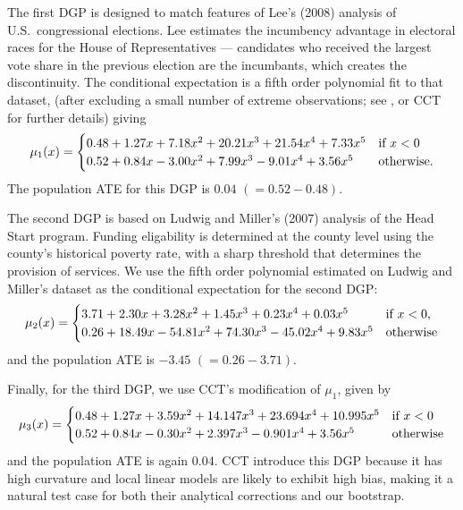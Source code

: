\documentclass[12pt,fleqn]{article}
\begin{document}
\nocite{lee2008rand}%
The first DGP is designed to match features of Lee's (2008) analysis of U.S.\
congressional elections. Lee estimates the incumbency advantage in electoral
races for the House of Representatives --- candidates who received the largest
vote share in the previous election are the incumbants, which creates the
discontinuity. The conditional expectation is a fifth order polynomial fit to
that dataset, (after excluding a small number of extreme observations; see
\citealp{IK}, or CCT for further details) giving
\begin{equation*}
  \mu_{1}(x) =
  \begin{cases}
    0.48 + 1.27x + 7.18x^{2} + 20.21x^{3} + 21.54x^{4} + 7.33x^{5}
    & \text{if}\ x < 0 \\
    0.52 + 0.84x - 3.00x^{2} + 7.99x^3 - 9.01x^4 + 3.56x^{5}
    & \text{otherwise}.
  \end{cases}
\end{equation*}
The population ATE for this DGP is $0.04$ $(= 0.52 - 0.48)$.

\nocite{ludwig2007}%
The second DGP is based on Ludwig and Miller's (2007) analysis of the Head Start
program. Funding eligability is determined at the county level using the
county's historical poverty rate, with a sharp threshold that determines the
provision of services. We use the fifth order polynomial estimated on Ludwig and
Miller's dataset as the conditional expectation for the second DGP:
\begin{equation*}
  \mu_{2}(x) =
  \begin{cases}
    3.71 + 2.30x + 3.28x^2 + 1.45x^3 + 0.23x^4 + 0.03x^5
    & \text{if}\ x < 0, \\
    0.26 + 18.49x - 54.81x^2 + 74.30x^3 - 45.02x^4 + 9.83x^5
    & \text{otherwise}
  \end{cases}
\end{equation*}
and the population ATE is $-3.45$ $(= 0.26 - 3.71)$.

Finally, for the third DGP, we use CCT's modification of $\mu_1$, given by
\begin{equation*}
  \mu_{3}(x) =
  \begin{cases}
    0.48 + 1.27x + 3.59 x^{2} + 14.147 x^3 + 23.694 x^4 + 10.995 x^5
    & \text{if}\ x < 0 \\
    0.52 + 0.84x - 0.30 x^{2} + 2.397 x^3 - 0.901 x^4 + 3.56 x^5
    & \text{otherwise}
\end{cases}
\end{equation*}
and the population ATE is again $0.04$. CCT introduce this DGP because it has
high curvature and local linear models are likely to exhibit high bias, making
it a natural test case for both their analytical corrections and our bootstrap.
\end{document}
